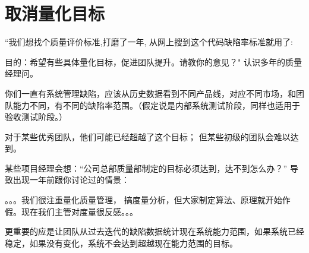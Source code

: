 \chapter{取消量化目标} %

``我们想找个质量评价标准,打磨了一年,
从网上搜到这个代码缺陷率标准就用了:


目的：希望有些具体量化目标，促进团队提升。请教你的意见？"
认识多年的质量经理问。

你们一直有系统管理缺陷，应该从历史数据看到不同产品线，对应不同市场，和团队能力不同，有不同的缺陷率范围。（假定说是内部系统测试阶段，同样也适用于验收测试阶段。）

对于某些优秀团队，他们可能已经超越了这个目标；
但某些初级的团队会难以达到。

某些项目经理会想：``公司总部质量部制定的目标必须达到，达不到怎么办？''
导致出现一年前跟你讨论过的情景：

。。。我们很注重量化质量管理，
搞度量分析，但大家制定算法、原理就开始作假。现在我们主管对度量很反感。。。

更重要的应是让团队从过去迭代的缺陷数据统计现在系统能力范围，如果系统已经稳定，如果没有变化，系统不会达到超越现在能力范围的目标。


